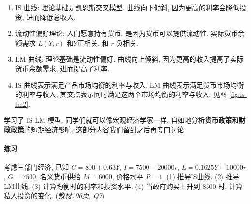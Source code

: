 \documentclass[11pt]{ctexart}
\begin{document}
\begin{enumerate}
\item
  IS 曲线: 理论基础是凯恩斯交叉模型. 曲线向下倾斜,  因为更高的利率会降低投资,  进而降低总收入.
\item
  流动性偏好理论: 人们愿意持有货币,  是因为货币可以提供流动性. 实际货币余额需求 $L(Y, r)$ 和$Y$正相关, 和 $r$ 负相关.
\item
  LM 曲线: 理论基础是流动性偏好. 曲线向上倾斜, 因为更高的收入提高了实际货币余额需求,  进而提高了利率.
\item
  IS 曲线表示满足产品市场均衡的利率与收入,  LM
  曲线表示满足货币市场均衡的利率与收入,  其交点表示同时满足这两个市场均衡的利率与收入,  见图 \ref{fig:is-lm2}. 
\end{enumerate}

学习了 IS-LM 模型,  同学们就可以像宏观经济学家一样, 
自如地分析\textbf{货币政策和财政政策}的短期经济影响.
这部分内容我们留到之后再专门讨论.

%

\paragraph{练习}
考虑三部门经济,  已知 $C=800+0.63Y$,  $I = 7500-20000r$, 
$L=0.1625Y-10000r$,  $G=7500$,  名义货币供给 $\bar{M} = 6000$,  价格水平 $\bar{P} = 1$.
(1) 推导IS曲线.
(2) 推导LM曲线.
(3) 计算均衡时的利率和投资水平.
(4) 当政府购买上升到 $8500$ 时,  计算私人投资的变化.
\hfill{(\textit{教材106页,  Q7})}
\end{document}
